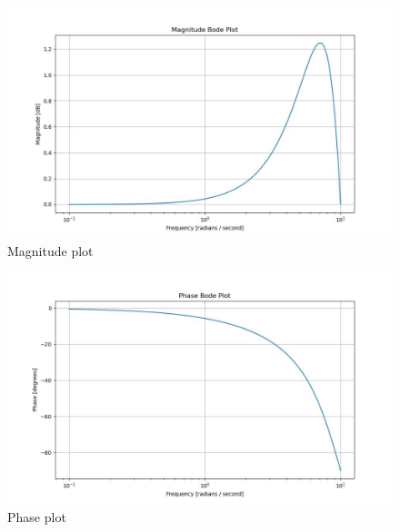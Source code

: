 \documentclass[journal,12pt,twocolumn]{IEEEtran}
\theoremstyle{remark}
\begin{document}
\begin{figure}[!ht]
\centering
\begin{center}
\includegraphics[width=\columnwidth]{Figure_1}
\end{center}
\caption{Magnitude plot}
\end{figure}
\begin{figure}[!ht]
\centering
\begin{center}
\includegraphics[width=\columnwidth]{Figure_2}
\end{center}
\caption{Phase plot}
\end{figure}
\end{document}
